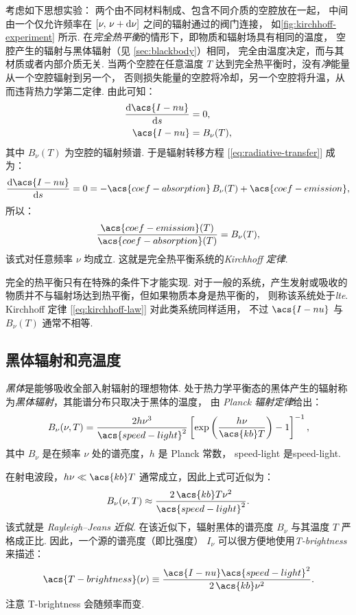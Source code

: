 考虑如下思想实验：
两个由不同材料制成、包含不同介质的空腔放在一起，
中间由一个仅允许频率在 $[\nu, \,\nu+\mathrm{d}\nu]$ 之间的辐射通过的阀门连接，
如\autoref{fig:kirchhoff-experiment} 所示.
在\emph{完全热平衡}的情形下，即物质和辐射场具有相同的温度，
空腔产生的辐射与黑体辐射（见 \autoref{sec:blackbody}）相同，
完全由温度决定，而与其材质或者内部介质无关.
当两个空腔在任意温度 $T$ 达到完全热平衡时，没有\emph{净}能量从一个空腔辐射到另一个，
否则损失能量的空腔将冷却，另一个空腔将升温，从而违背热力学第二定律.
由此可知：
\begin{align}
  \diff{\acs{I-nu}}{s} & = 0 , \\
  \acs{I-nu} & = B_{\nu}(T) ,
\end{align}
其中 $B_{\nu}(T)$ 为空腔的辐射频谱.
于是辐射转移方程 [\autoref{eq:radiative-transfer}] 成为：
\begin{equation}
  \diff{\acs{I-nu}}{s} = 0
    = - \acs{coef-absorption} \,B_{\nu}(T) + \acs{coef-emission} ,
\end{equation}
所以：
\begin{equation}
  \label{eq:kirchhoff-law}
  \frac{\acs{coef-emission}(T)}{\acs{coef-absorption}(T)} = B_{\nu}(T) ,
\end{equation}
该式对任意频率 $\nu$ 均成立.
这就是完全热平衡系统的\emph{Kirchhoff 定律}.

完全的热平衡只有在特殊的条件下才能实现.
对于一般的系统，产生发射或吸收的物质并不与辐射场达到热平衡，但如果物质本身是热平衡的，
则称该系统处于\emph{\acf{lte}}.
Kirchhoff 定律 [\autoref{eq:kirchhoff-law}] 对此类系统同样适用，
不过 $\acs{I-nu}$ 与 $B_{\nu}(T)$ 通常不相等.

\subsection{黑体辐射和亮温度}
\label{sec:blackbody}

\emph{黑体}是能够吸收全部入射辐射的理想物体.
处于热力学平衡态的黑体产生的辐射称为\emph{黑体辐射}，其能谱分布只取决于黑体的温度，
由 \emph{Planck 辐射定律}给出：
\begin{equation}
  \label{eq:planck}
  B_{\nu}(\nu, T) = \frac{2 h \nu^3}{\acs{speed-light}^2}
    \left[ \exp\left( \frac{h \nu}{\acs{kb} T} \right) - 1 \right]^{-1} ,
\end{equation}
其中 $B_{\nu}$ 是在频率 $\nu$ 处的谱亮度，$h$ 是 Planck 常数，
\acs{speed-light} 是\acl{speed-light}.

在射电波段，$h\nu \ll \acs{kb}T$ 通常成立，因此上式可近似为：
\begin{equation}
  \label{eq:rj-approx}
  B_{\nu}(\nu, T) \approx \frac{2\,\acs{kb}T \nu^2}{\acs{speed-light}^2} .
\end{equation}
该式就是 \emph{Rayleigh--Jeans 近似}.
在该近似下，辐射黑体的谱亮度 $B_{\nu}$ 与其温度 $T$ 严格成正比.
因此，一个源的谱亮度（即比强度） $I_{\nu}$
可以很方便地使用\emph{\acf{T-brightness}} 来描述：
\begin{equation}
  \label{eq:Tb}
  \acs{T-brightness}(\nu)
    \equiv \frac{\acs{I-nu} \acs{speed-light}^2}{2 \,\acs{kb} \nu^2} .
\end{equation}
注意 \acs{T-brightness} 会随频率而变.

